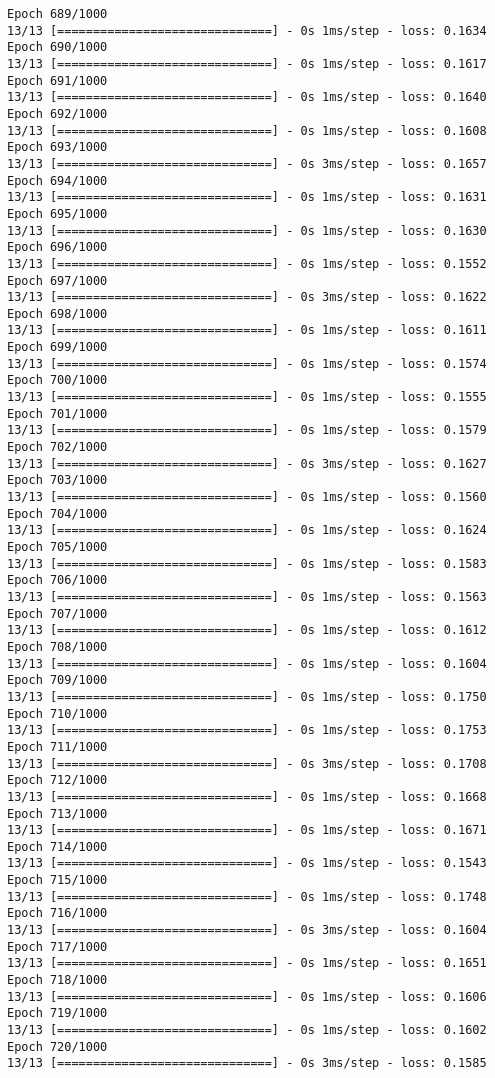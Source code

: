 \documentclass[11pt]{article}
\begin{document}
\begin{Verbatim}[commandchars=\\\{\}]
Epoch 689/1000
13/13 [==============================] - 0s 1ms/step - loss: 0.1634
Epoch 690/1000
13/13 [==============================] - 0s 1ms/step - loss: 0.1617
Epoch 691/1000
13/13 [==============================] - 0s 1ms/step - loss: 0.1640
Epoch 692/1000
13/13 [==============================] - 0s 1ms/step - loss: 0.1608
Epoch 693/1000
13/13 [==============================] - 0s 3ms/step - loss: 0.1657
Epoch 694/1000
13/13 [==============================] - 0s 1ms/step - loss: 0.1631
Epoch 695/1000
13/13 [==============================] - 0s 1ms/step - loss: 0.1630
Epoch 696/1000
13/13 [==============================] - 0s 1ms/step - loss: 0.1552
Epoch 697/1000
13/13 [==============================] - 0s 3ms/step - loss: 0.1622
Epoch 698/1000
13/13 [==============================] - 0s 1ms/step - loss: 0.1611
Epoch 699/1000
13/13 [==============================] - 0s 1ms/step - loss: 0.1574
Epoch 700/1000
13/13 [==============================] - 0s 1ms/step - loss: 0.1555
Epoch 701/1000
13/13 [==============================] - 0s 1ms/step - loss: 0.1579
Epoch 702/1000
13/13 [==============================] - 0s 3ms/step - loss: 0.1627
Epoch 703/1000
13/13 [==============================] - 0s 1ms/step - loss: 0.1560
Epoch 704/1000
13/13 [==============================] - 0s 1ms/step - loss: 0.1624
Epoch 705/1000
13/13 [==============================] - 0s 1ms/step - loss: 0.1583
Epoch 706/1000
13/13 [==============================] - 0s 1ms/step - loss: 0.1563
Epoch 707/1000
13/13 [==============================] - 0s 1ms/step - loss: 0.1612
Epoch 708/1000
13/13 [==============================] - 0s 1ms/step - loss: 0.1604
Epoch 709/1000
13/13 [==============================] - 0s 1ms/step - loss: 0.1750
Epoch 710/1000
13/13 [==============================] - 0s 1ms/step - loss: 0.1753
Epoch 711/1000
13/13 [==============================] - 0s 3ms/step - loss: 0.1708
Epoch 712/1000
13/13 [==============================] - 0s 1ms/step - loss: 0.1668
Epoch 713/1000
13/13 [==============================] - 0s 1ms/step - loss: 0.1671
Epoch 714/1000
13/13 [==============================] - 0s 1ms/step - loss: 0.1543
Epoch 715/1000
13/13 [==============================] - 0s 1ms/step - loss: 0.1748
Epoch 716/1000
13/13 [==============================] - 0s 3ms/step - loss: 0.1604
Epoch 717/1000
13/13 [==============================] - 0s 1ms/step - loss: 0.1651
Epoch 718/1000
13/13 [==============================] - 0s 1ms/step - loss: 0.1606
Epoch 719/1000
13/13 [==============================] - 0s 1ms/step - loss: 0.1602
Epoch 720/1000
13/13 [==============================] - 0s 3ms/step - loss: 0.1585

\end{Verbatim}
\end{document}
